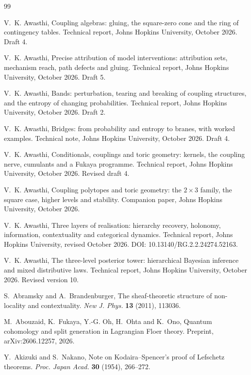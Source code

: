 \documentclass[11pt]{article}
\theoremstyle{definition}
\theoremstyle{remark}
\begin{document}
\begin{thebibliography}{99}

V.~K. Awasthi, Coupling algebras: gluing, the square-zero cone and the ring of contingency tables. Technical report, Johns
Hopkins University, October 2026. Draft 4.

V.~K. Awasthi, Precise attribution of model interventions: attribution sets, mechanism reach, path defects and gluing.
Technical report, Johns Hopkins University, October 2026. Draft 5.

V.~K. Awasthi, Bands: perturbation, tearing and breaking of coupling structures, and the entropy of changing probabilities.
Technical report, Johns Hopkins University, October 2026. Draft 2.

V.~K. Awasthi, Bridges: from probability and entropy to branes, with worked examples. Technical note, Johns Hopkins University,
October 2026. Draft 4.

V.~K. Awasthi, Conditionals, couplings and toric geometry: kernels, the coupling nerve, cumulants and a {F}ukaya
programme. Technical report, Johns Hopkins University, October 2026. Revised draft 4.

V.~K. Awasthi, Coupling polytopes and toric geometry: the $2\times3$ family, the square case, higher levels and stability.
Companion paper, Johns Hopkins University, October 2026.

V.~K. Awasthi, Three layers of realisation: hierarchy recovery, holonomy, information, contextuality and categorical
dynamics. Technical report, Johns Hopkins University, revised October 2026. DOI: 10.13140/RG.2.2.24274.52163.

V.~K. Awasthi, The three-level posterior tower: hierarchical {B}ayesian inference and mixed distributive laws.
Technical report, Johns Hopkins University, October 2026. Revised version 10.

S.~Abramsky and A.~Brandenburger, The sheaf-theoretic structure of non-locality and contextuality. \emph{New J. Phys.}
\textbf{13} (2011), 113036.

M.~Abouzaid, K.~Fukaya, Y.-G. Oh, H.~Ohta and K.~Ono, Quantum cohomology and split generation in Lagrangian Floer theory.
Preprint, arXiv:2606.12257, 2026.

Y.~Akizuki and S.~Nakano, Note on Kodaira--Spencer's proof of Lefschetz theorems. \emph{Proc. Japan Acad.} \textbf{30} (1954),
266--272.


\end{thebibliography}
\end{document}
